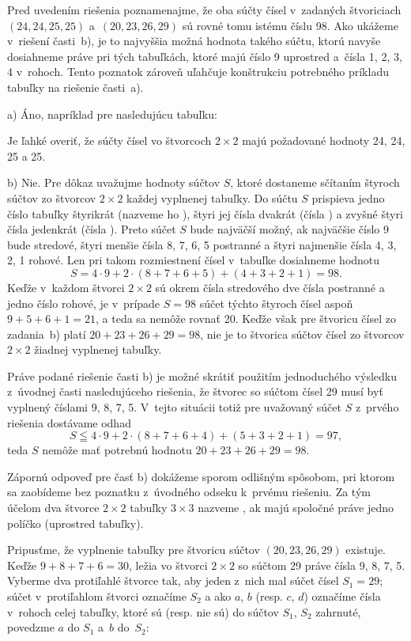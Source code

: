 {%
Pred uvedením riešenia poznamenajme, že
oba súčty čísel v~zadaných štvoriciach $(24, 24, 25, 25)$ a~$(20,23,26,29)$
sú rovné tomu istému číslu 98. Ako ukážeme v~riešení časti~b), je to
najvyššia možná hodnota takého súčtu, ktorú navyše dosiahneme
práve pri tých tabuľkách, ktoré majú číslo 9 uprostred a~čísla 1, 2, 3, 4 v~rohoch. Tento poznatok zároveň uľahčuje konštrukciu potrebného príkladu tabuľky na riešenie časti~a).

\smallskip
a) Áno, napríklad pre nasledujúcu tabuľku:
%

Je ľahké overiť, že
súčty čísel vo štvorcoch $2\times 2$ majú požadované hodnoty
24, 24, 25 a 25.

b) Nie. Pre dôkaz uvažujme hodnoty súčtov $S$, ktoré
dostaneme sčítaním štyroch súčtov zo štvorcov $2\times2$ každej
vyplnenej tabuľky. Do súčtu $S$ prispieva jedno číslo tabuľky
štyrikrát (nazveme ho ), štyri jej čísla
dvakrát (čísla ) a zvyšné štyri čísla jedenkrát
(čísla ). Preto súčet $S$ bude najväčší možný,
ak najväčšie číslo 9 bude stredové, štyri menšie čísla 8, 7,
6, 5 postranné a štyri najmenšie čísla 4, 3, 2, 1 rohové.
Len pri takom rozmiestnení čísel v~tabuľke dosiahneme hodnotu
$$
S=4\cdot 9+2\cdot(8+7+6+5)+(4+3+2+1)=98.
$$
Keďže v~každom štvorci $2\times2$ sú okrem čísla
stredového dve čísla postranné a jedno číslo rohové,
je v~prípade $S=98$ súčet týchto štyroch čísel aspoň
$9+5+6+1=21$, a teda sa nemôže rovnať 20. Keďže
však pre štvoricu čísel zo zadania~b) platí $20+23+26+29=98$,
nie je to štvorica súčtov čísel zo štvorcov $2\times2$
žiadnej vyplnenej tabuľky.

\poznamka
Práve podané riešenie časti b) je možné skrátiť použitím
jednoduchého výsledku z~úvodnej časti nasledujúceho riešenia,
že štvorec so súčtom čísel 29 musí byť vyplnený číslami
9, 8, 7, 5. V~tejto situácii totiž pre uvažovaný súčet $S$ z~prvého
riešenia dostávame odhad
$$
S\leqq 4\cdot 9+2\cdot(8+7+6+4)+(5+3+2+1)=97,
$$
teda $S$ nemôže mať potrebnú hodnotu $20+23+26+29=98$.

\ineriesenie
Zápornú odpoveď pre časť b) dokážeme sporom
odlišným spôsobom, pri ktorom sa zaobídeme bez poznatku
z~úvodného odseku k~prvému riešeniu.
Za tým účelom dva štvorce $2\times2$ tabuľky $3\times3$ nazveme ,
ak majú spoločné práve jedno políčko (uprostred tabuľky).

Pripusťme, že vyplnenie tabuľky pre štvoricu súčtov $(20,23,26,29)$
existuje. Keďže $9+8+7+6=30$, ležia vo štvorci $2\times2$ so súčtom 29
práve čísla 9, 8, 7, 5. Vyberme dva protiľahlé štvorce tak,
aby jeden z~nich mal súčet čísel $S_1=29$; súčet v~protiľahlom
štvorci označíme $S_2$ a ako $a$, $b$ (resp. $c$, $d$)
označíme čísla v~rohoch celej tabuľky, ktoré sú (resp. nie sú)
do súčtov $S_1$, $S_2$ zahrnuté, povedzme $a$ do $S_1$ a~$b$
do~$S_2$:
%

}
